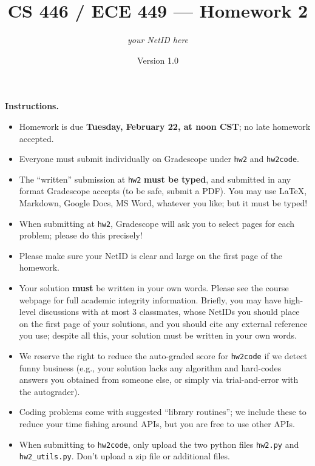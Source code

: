 \documentclass{article}
\title{CS 446 / ECE 449 --- Homework 2}
\author{\emph{your NetID here}}
\date{Version 1.0}
\theoremstyle{definition}
\theoremstyle{remark}
\begin{document}
\maketitle

\noindent\textbf{Instructions.}
\begin{itemize}
  \item
    Homework is due \textbf{Tuesday, February 22, at noon CST}; no late homework accepted.

  \item
    Everyone must submit individually on Gradescope under \texttt{hw2} and \texttt{hw2code}.

  \item
    The ``written'' submission at \texttt{hw2} \textbf{must be typed}, and submitted in
    any format Gradescope accepts (to be safe, submit a PDF).  You may use \LaTeX, Markdown,
    Google Docs, MS Word, whatever you like; but it must be typed!

  \item
    When submitting at \texttt{hw2}, Gradescope will ask you to select pages
    for each problem; please do this precisely!

  \item
    Please make sure your NetID is clear and large on the first page of the homework.

  \item
    Your solution \textbf{must} be written in your own words.
    Please see the course webpage for full academic integrity information.
    Briefly, you may have high-level discussions with at most 3 classmates,
    whose NetIDs you should place on the first page of your solutions,
    and you should cite any external reference you use; despite all this,
    your solution must be written in your own words.

    \item
      We reserve the right to reduce the auto-graded score for
      \texttt{hw2code} if we detect funny business (e.g., your solution
      lacks any algorithm and hard-codes answers you obtained from
      someone else, or simply via trial-and-error with the autograder).

    \item
      Coding problems come with suggested ``library routines''; we include these to reduce
      your time fishing around APIs, but you are free to use other APIs.

    \item
      When submitting to \texttt{hw2code}, only upload the two python files \texttt{hw2.py} and \texttt{hw2\_utils.py}. Don't upload a zip file or additional files.
    
\end{itemize}
\end{document}
